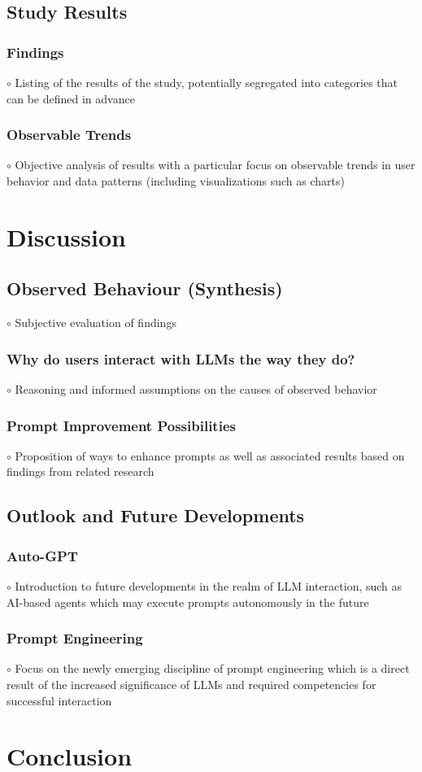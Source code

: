 \documentclass[sigconf]{acmart}
\begin{document}
  \subsection{Study Results}
    \subsubsection{Findings}
$\circ$ Listing of the results of the study, potentially segregated into categories that can be defined in advance
    \subsubsection{Observable Trends}
$\circ$ Objective analysis of results with a particular focus on observable trends in user behavior and data patterns (including visualizations such as charts)

\section{Discussion}
  \subsection{Observed Behaviour (Synthesis)}
$\circ$ Subjective evaluation of findings
    \subsubsection{Why do users interact with LLMs the way they do?}
$\circ$ Reasoning and informed assumptions on the causes of observed behavior
    \subsubsection{Prompt Improvement Possibilities}

$\circ$ Proposition of ways to enhance prompts as well as associated results based on findings from related research
  \subsection{Outlook and Future Developments}
    \subsubsection{Auto-GPT}
$\circ$ Introduction to future developments in the realm of LLM interaction, such as AI-based agents which may execute prompts autonomously in the future
    \subsubsection{Prompt Engineering}
$\circ$ Focus on the newly emerging discipline of prompt engineering which is a direct result of the increased significance of LLMs and required competencies for successful interaction

\section{Conclusion}






\end{document}
